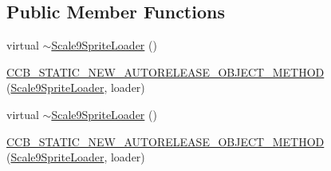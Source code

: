 \subsection*{Public Member Functions}
\begin{DoxyCompactItemize}
\item 
virtual \hyperlink{classcocosbuilder_1_1Scale9SpriteLoader_a56d0f641d7070250c2a59a03849d6843}{$\sim$\+Scale9\+Sprite\+Loader} ()
\item 
\hyperlink{classcocosbuilder_1_1Scale9SpriteLoader_ac86183e2b7808236d62c46c7198ba732}{C\+C\+B\+\_\+\+S\+T\+A\+T\+I\+C\+\_\+\+N\+E\+W\+\_\+\+A\+U\+T\+O\+R\+E\+L\+E\+A\+S\+E\+\_\+\+O\+B\+J\+E\+C\+T\+\_\+\+M\+E\+T\+H\+OD} (\hyperlink{classcocosbuilder_1_1Scale9SpriteLoader}{Scale9\+Sprite\+Loader}, loader)
\item 
virtual \hyperlink{classcocosbuilder_1_1Scale9SpriteLoader_a56d0f641d7070250c2a59a03849d6843}{$\sim$\+Scale9\+Sprite\+Loader} ()
\item 
\hyperlink{classcocosbuilder_1_1Scale9SpriteLoader_ac86183e2b7808236d62c46c7198ba732}{C\+C\+B\+\_\+\+S\+T\+A\+T\+I\+C\+\_\+\+N\+E\+W\+\_\+\+A\+U\+T\+O\+R\+E\+L\+E\+A\+S\+E\+\_\+\+O\+B\+J\+E\+C\+T\+\_\+\+M\+E\+T\+H\+OD} (\hyperlink{classcocosbuilder_1_1Scale9SpriteLoader}{Scale9\+Sprite\+Loader}, loader)
\end{DoxyCompactItemize}
